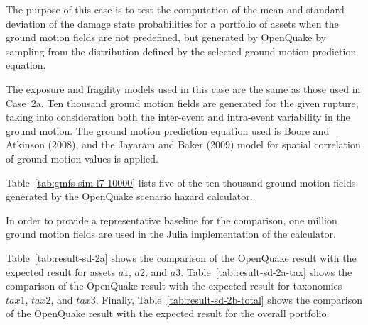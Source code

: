 The purpose of this case is to test the computation of the mean and standard deviation of the damage state probabilities for a portfolio of assets when the ground motion fields are not predefined, but generated by OpenQuake by sampling from the distribution defined by the selected ground motion prediction equation.

The exposure and fragility models used in this case are the same as those used in Case~2a. Ten thousand ground motion fields are generated for the given rupture, taking into consideration both the inter-event and intra-event variability in the ground motion. The ground motion prediction equation used is Boore and Atkinson (2008), and the Jayaram and Baker (2009) model for spatial correlation of ground motion values is applied.

Table~\ref{tab:gmfs-sim-l7-10000} lists five of the ten thousand ground motion fields generated by the OpenQuake scenario hazard calculator.

In order to provide a representative baseline for the comparison, one million ground motion fields are used in the Julia implementation of the calculator.





Table~\ref{tab:result-sd-2a} shows the comparison of the OpenQuake result with the expected result for assets $a1$, $a2$, and $a3$. Table~\ref{tab:result-sd-2a-tax} shows the comparison of the OpenQuake result with the expected result for taxonomies $tax1$, $tax2$, and $tax3$. Finally, Table~\ref{tab:result-sd-2b-total} shows the comparison of the OpenQuake result with the expected result for the overall portfolio.